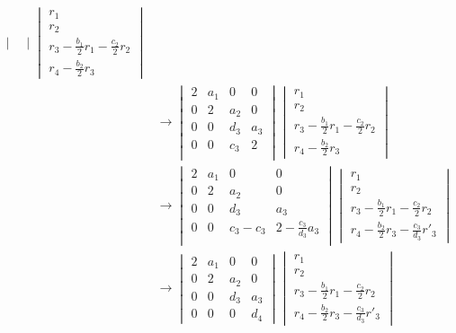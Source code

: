 \documentclass{article}
\begin{document}
\begin{align*}
\begin{vmatrix}
    \end{vmatrix}
    \begin{vmatrix}
        r_{1} \\ r_{2}  \\ r_{3} - \frac{b_{1}}{2}r_{1} -\frac{c_{2}}{2}r_{2} \\ r_{4} - \frac{b_{2}}{2}r_{3}
    \end{vmatrix}  \\[1mm]
    &\longrightarrow 
    \begin{vmatrix}
    2 & a_{1} & 0 & 0  \\
    0 & 2 & a_{2} & 0  \\
    0 & 0 & d_{3}& a_{3}\\
    0 & 0& c_{3}& 2\\
    \end{vmatrix}
    \begin{vmatrix}
        r_{1} \\ r_{2}  \\ r_{3} - \frac{b_{1}}{2}r_{1} -\frac{c_{2}}{2}r_{2}  \\ r_{4} - \frac{b_{2}}{2}r_{3}
    \end{vmatrix} \\[1mm]
    &\longrightarrow 
    \begin{vmatrix}
    2 & a_{1} & 0 & 0  \\
    0 & 2 & a_{2} & 0  \\
    0 & 0 & d_{3}& a_{3}\\
    0 & 0& c_{3} - c_{3}& 2 - \frac{c_{3}}{d_{3}}a_{3}\\
    \end{vmatrix}
    \begin{vmatrix}
        r_{1} \\ r_{2}  \\ r_{3} - \frac{b_{1}}{2}r_{1} -\frac{c_{2}}{2}r_{2}  \\ r_{4} - \frac{b_{2}}{2}r_{3} - \frac{c_{3}}{d_{3}}r'_{3}
    \end{vmatrix}  \\[1mm]
    &\longrightarrow 
    \begin{vmatrix}
    2 & a_{1} & 0 & 0  \\
    0 & 2 & a_{2} & 0  \\
    0 & 0 & d_{3}& a_{3}\\
    0 & 0& 0& d_{4}
    \end{vmatrix}
    \begin{vmatrix}
        r_{1} \\ r_{2}  \\ r_{3} - \frac{b_{1}}{2}r_{1} -\frac{c_{2}}{2}r_{2} \\ r_{4} - \frac{b_{2}}{2}r_{3} - \frac{c_{3}}{d_{3}}r'_{3}
    \end{vmatrix} 
\end{align*}
\end{document}
